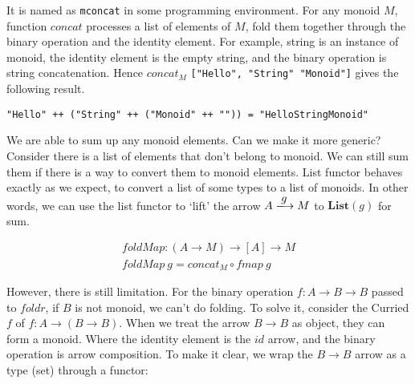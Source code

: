 \documentclass{article}
\begin{document}
It is named as \texttt{mconcat} in some programming environment. For any monoid $M$, function $concat$ processes a list of elements of $M$, fold them together through the binary operation and the identity element. For example, string is an instance of monoid, the identity element is the empty string, and the binary operation is string concatenation. Hence $concat_M$ \texttt{["Hello", "String" "Monoid"]} gives the following result.

\begin{verbatim}
"Hello" ++ ("String" ++ ("Monoid" ++ "")) = "HelloStringMonoid"
\end{verbatim}

We are able to sum up any monoid elements. Can we make it more generic? Consider there is a list of elements that don't belong to monoid. We can still sum them if there is a way to convert them to monoid elements. List functor behaves exactly as we expect, to convert a list of some types to a list of monoids. In other words, we can use the list functor to `lift' the arrow $A \arrowto{g} M$ to $\mathbf{List}(g)$ for sum.

\begin{center}
\end{center}

\[
\begin{array}{l}
foldMap : (A \to M) \to [A] \to M \\
foldMap\ g = concat_M \circ fmap\ g
\end{array}
\]

However, there is still limitation. For the binary operation $f : A \to B \to B$ passed to $foldr$, if $B$ is not monoid, we can't do folding. To solve it, consider the Curried $f$ of $f : A \to (B \to B)$. When we treat the arrow $B \to B$ as object, they can form a monoid. Where the identity element is the $id$ arrow, and the binary operation is arrow composition. To make it clear, we wrap the $B \to B$ arrow as a type (set) through a functor:
\end{document}
